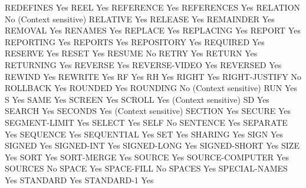 REDEFINES                       Yes
REEL                            Yes
REFERENCE                       Yes
REFERENCES                      Yes
RELATION                        No (Context sensitive)
RELATIVE                        Yes
RELEASE                         Yes
REMAINDER                       Yes
REMOVAL                         Yes
RENAMES                         Yes
REPLACE                         Yes
REPLACING                       Yes
REPORT                          Yes
REPORTING                       Yes
REPORTS                         Yes
REPOSITORY                      Yes
REQUIRED                        Yes
RESERVE                         Yes
RESET                           Yes
RESUME                          No
RETRY                           Yes
RETURN                          Yes
RETURNING                       Yes
REVERSE                         Yes
REVERSE-VIDEO                   Yes
REVERSED                        Yes
REWIND                          Yes
REWRITE                         Yes
RF                              Yes
RH                              Yes
RIGHT                           Yes
RIGHT-JUSTIFY                   No
ROLLBACK                        Yes
ROUNDED                         Yes
ROUNDING                        No (Context sensitive)
RUN                             Yes
S                               Yes
SAME                            Yes
SCREEN                          Yes
SCROLL                          Yes (Context sensitive)
SD                              Yes
SEARCH                          Yes
SECONDS                         Yes (Context sensitive)
SECTION                         Yes
SECURE                          Yes
SEGMENT-LIMIT                   Yes
SELECT                          Yes
SELF                            No
SENTENCE                        Yes
SEPARATE                        Yes
SEQUENCE                        Yes
SEQUENTIAL                      Yes
SET                             Yes
SHARING                         Yes
SIGN                            Yes
SIGNED                          Yes
SIGNED-INT                      Yes
SIGNED-LONG                     Yes
SIGNED-SHORT                    Yes
SIZE                            Yes
SORT                            Yes
SORT-MERGE                      Yes
SOURCE                          Yes
SOURCE-COMPUTER                 Yes
SOURCES                         No
SPACE                           Yes
SPACE-FILL                      No
SPACES                          Yes
SPECIAL-NAMES                   Yes
STANDARD                        Yes
STANDARD-1                      Yes
